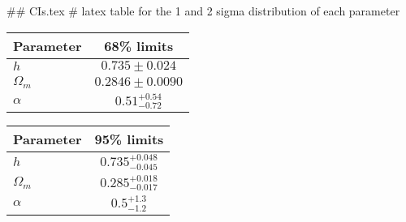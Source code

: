 ## CIs.tex
# latex table for the 1 and 2 sigma distribution of each parameter

\begin{tabular} { l  c}
 Parameter &  68\% limits\\
\hline
{\boldmath$h              $} & $0.735\pm 0.024            $\\
{\boldmath$\Omega_m       $} & $0.2846\pm 0.0090          $\\
{\boldmath$\alpha         $} & $0.51^{+0.54}_{-0.72}      $\\
\hline
\end{tabular}

\begin{tabular} { l  c}
 Parameter &  95\% limits\\
\hline
{\boldmath$h              $} & $0.735^{+0.048}_{-0.045}   $\\
{\boldmath$\Omega_m       $} & $0.285^{+0.018}_{-0.017}   $\\
{\boldmath$\alpha         $} & $0.5^{+1.3}_{-1.2}         $\\
\hline
\end{tabular}
